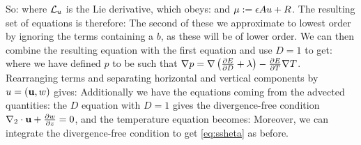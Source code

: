 So:
where $\mathcal{L}_{u}$ is the Lie derivative, which obeys:
and $\mu:=\epsilon Au + R$. The resulting set of equations is therefore:
The second of these we approximate to lowest order by ignoring the terms containing a $b$, as these will be of lower order.  We can then combine the resulting equation with the first equation and use $D=1$ to get:
where we have defined $p$ to be such that $\nabla p = \nabla\left(\frac{\partial E}{\partial D} + \lambda\right) - \frac{\partial E}{\partial T}\nabla T$.\\
\linebreak
Rearranging terms and separating horizontal and vertical components by $u = (\mathbf{u},w)$ gives:
Additionally we have the equations coming from the advected quantities: the $D$ equation with $D=1$ gives the divergence-free condition $\nabla_{2}\cdot\mathbf{u} + \frac{\partial w}{\partial z} = 0$, and the temperature equation becomes:
Moreover, we can integrate the divergence-free condition to get \cref{eq:ssheta} as before. 
\fi